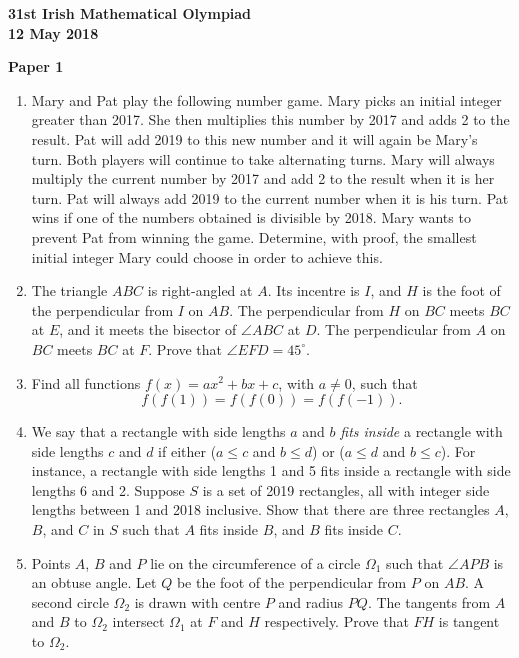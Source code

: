 \documentclass[12pt]{article}
\begin{document}
\begin{center}
{\large\bfseries 31st Irish Mathematical Olympiad\\12 May 2018}
\end{center}
\bigskip\noindent\textbf{Paper 1}\bigskip
\begin{enumerate}
\item Mary and Pat play the following number game. Mary picks an initial integer greater than 2017. She then multiplies this number by 2017 and adds 2 to the result. Pat will add 2019 to this new number and it will again be Mary's turn. Both players will continue to take alternating turns. Mary will always multiply the current number by 2017 and add 2 to the result when it is her turn. Pat will always add 2019 to the current number when it is his turn. Pat wins if one of the numbers obtained is divisible by 2018. Mary wants to prevent Pat from winning the game. Determine, with proof, the smallest initial integer Mary could choose in order to achieve this.

\item The triangle $ABC$ is right-angled at $A$. Its incentre is $I$, and $H$ is the foot of the perpendicular from $I$ on $AB$. The perpendicular from $H$ on $BC$ meets $BC$ at $E$, and it meets the bisector of $\angle ABC$ at $D$. The perpendicular from $A$ on $BC$ meets $BC$ at $F$. Prove that $\angle EFD = 45^\circ$.

\item Find all functions $f(x) = ax^2 + bx + c$, with $a \neq 0$, such that
\[
f(f(1)) = f(f(0)) = f(f(-1)).
\]

\item We say that a rectangle with side lengths $a$ and $b$ \emph{fits inside} a rectangle with side lengths $c$ and $d$ if either ($a \leq c$ and $b \leq d$) or ($a \leq d$ and $b \leq c$). For instance, a rectangle with side lengths 1 and 5 fits inside a rectangle with side lengths 6 and 2. Suppose $S$ is a set of 2019 rectangles, all with integer side lengths between 1 and 2018 inclusive. Show that there are three rectangles $A$, $B$, and $C$ in $S$ such that $A$ fits inside $B$, and $B$ fits inside $C$.

\item Points $A$, $B$ and $P$ lie on the circumference of a circle $\Omega_1$ such that $\angle APB$ is an obtuse angle. Let $Q$ be the foot of the perpendicular from $P$ on $AB$. A second circle $\Omega_2$ is drawn with centre $P$ and radius $PQ$. The tangents from $A$ and $B$ to $\Omega_2$ intersect $\Omega_1$ at $F$ and $H$ respectively. Prove that $FH$ is tangent to $\Omega_2$.
\end{enumerate}
\end{document}
